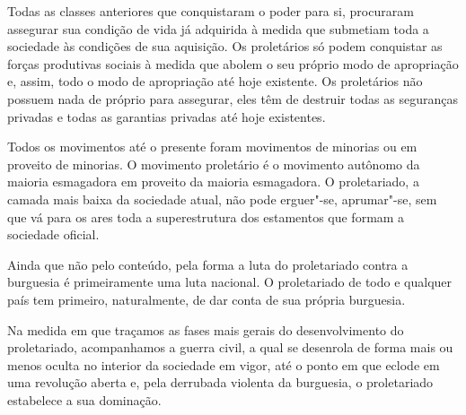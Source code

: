 Todas as classes anteriores que conquistaram o poder para si, procuraram
assegurar sua condição de vida já adquirida à medida que submetiam toda
a sociedade às condições de sua aquisição. Os proletários só podem
conquistar as forças produtivas sociais à medida que abolem o seu
próprio modo de apropriação e, assim, todo o modo de apropriação até
hoje existente. Os proletários não possuem nada de próprio para
assegurar, eles têm de destruir todas as seguranças privadas e todas as
garantias privadas até hoje existentes.

Todos os movimentos até o presente foram movimentos de minorias ou em
proveito de minorias. O movimento proletário é o movimento autônomo da
maioria esmagadora em proveito da maioria esmagadora. O proletariado, a
camada mais baixa da sociedade atual, não pode erguer"-se,
aprumar"-se, sem que vá para os ares toda a superestrutura dos
estamentos que formam a sociedade oficial.

Ainda que não pelo conteúdo, pela forma a luta do proletariado contra a
burguesia é primeiramente uma luta nacional. O proletariado de todo e
qualquer país tem primeiro, naturalmente, de dar conta de sua própria
burguesia.

Na medida em que traçamos as fases mais gerais do desenvolvimento do
proletariado, acompanhamos a guerra civil, a qual se desenrola de forma
mais ou menos oculta no interior da sociedade em vigor, até o ponto em
que eclode em uma revolução aberta e, pela derrubada violenta da
burguesia, o proletariado estabelece a sua dominação.

